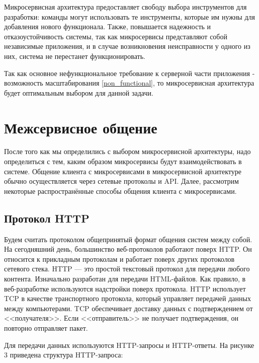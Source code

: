        Микросервисная архитектура предоставляет свободу выбора инструментов для разработки: команды могут использовать те инструменты, которые им нужны для добавления нового функционала. Также, повышается надежность и отказоустойчивость системы, так как микросервисы представляют собой независимые приложения, и в случае возникновения неисправности у одного из них, система не перестанет функционировать. \cite{monovsmicro}
            
       Так как основное нефункциональное требование к серверной части приложения - возможность масштабирования \ref{non_functional}, то микросервисная архитектура будет оптимальным выбором для данной задачи.




        \section{Межсервисное общение} \label{messaging}
        После того как мы определились с выбором микросервисной архитектуры, надо определиться с тем, каким образом микросервисы будут взаимодействовать в системе. Общение клиента с микросервисами в микросервисной архитектуре обычно осуществляется через сетевые протоколы и API. Далее, рассмотрим некоторые распространённые способы общения клиента с микросервисами.

        \subsection{Протокол HTTP}
         Будем считать протоколом общепринятый формат общения систем между собой. На сегодняшний день, большинство веб-протоколов работают поверх HTTP. Он относится к прикладным протоколам и работает поверх других протоколов сетевого стека. HTTP — это простой текстовый протокол для передачи любого контента. Изначально разработан для передачи HTML-файлов. Как правило, в веб-разработке используются надстройки поверх протокола. HTTP использует TCP в качестве транспортного протокола, который управляет передачей данных между компьютерами. TCP обеспечивает доставку данных с подтверждением от <<получателя>>. Если <<отправитель>> не получает подтверждения, он повторно отправляет пакет. \cite{http}

         Для передачи данных используются HTTP-запросы и HTTP-ответы. На рисунке 3 приведена структура HTTP-запроса:

